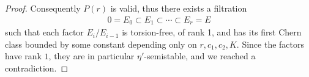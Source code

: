 \documentclass[10pt,a4paper]{amsart}
\begin{document}
\begin{proof}
Consequently $P(r)$ is valid, thus there exists a filtration 
\begin{align*}
     0 = E_0 \subset E_1 \subset \cdots \subset E_r =E
\end{align*}
such that each factor $E_i/E_{i-1}$ is torsion-free, of rank 1, and has its first Chern class bounded by some constant depending only on $r, c_1, c_2, K$. Since the factors have rank $1$, they are in particular $\eta'$-semistable, and we reached a contradiction.
\end{proof}
\end{document}
